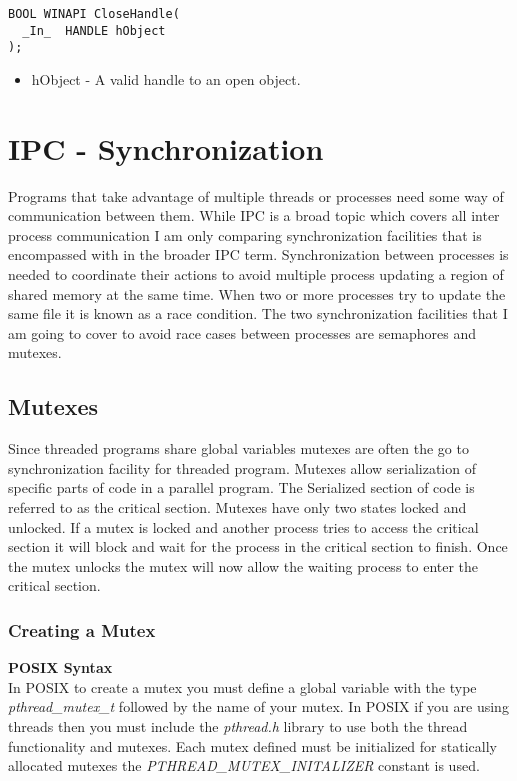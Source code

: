 \documentclass[letterpaper,10pt,notitlepage,fleqn]{article}
\begin{document}
\begin{verbatim}
BOOL WINAPI CloseHandle(
  _In_  HANDLE hObject
);
\end{verbatim}

\begin{itemize}
\item hObject - A valid handle to an open object.
\end{itemize}

\section{IPC - Synchronization}
Programs that take advantage of multiple threads or processes need some way of communication between them. While IPC is a broad topic which covers all inter process communication I am only comparing synchronization facilities that is encompassed with in the broader IPC term. Synchronization between processes is needed to coordinate their actions to avoid multiple process updating a region of shared memory at the same time. When two or more processes try to update the same file it is known as a race condition. The two synchronization facilities that I am going to cover to avoid race cases between processes are semaphores and mutexes.

\subsection{Mutexes}
Since threaded programs share global variables mutexes are often the go to synchronization facility for threaded program. Mutexes allow serialization of specific parts of code in a parallel program. The Serialized section of code is referred to as the critical section. Mutexes have only two states locked and unlocked. If a mutex is locked and another process tries to access the critical section it will block and wait for the process in the critical section to finish. Once the mutex unlocks the mutex will now allow the waiting process to enter the critical section.

\subsubsection{Creating a Mutex}
\textbf{POSIX Syntax} \\
In POSIX to create a mutex you must define a global variable with the type \textit{pthread\_mutex\_t} followed by the name of your mutex. In POSIX if you are using threads then you must include the \textit{pthread.h} library to use both the thread functionality and mutexes. Each mutex defined must be initialized for statically allocated mutexes the \textit{PTHREAD\_MUTEX\_INITALIZER} constant is used. \\ \\
\end{document}
